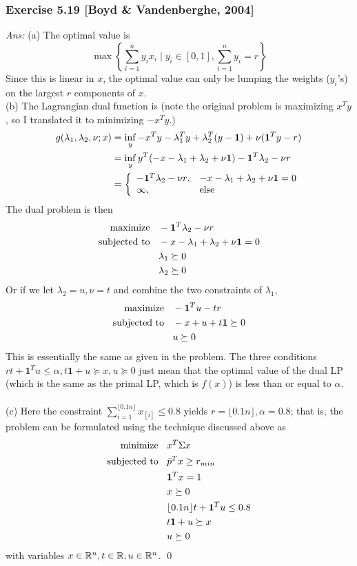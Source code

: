 \documentclass[12pt,a4paper]{article}
\renewcommand{\l}{\left}\renewcommand{\r}{\right}
\newcommand{\casebrak}[4]{\left \{ \begin{array}{ll} {#1},&{#2}\\{#3},&{#4} \end{array} \right.}
\newcommand{\SUM}[2]{\sum\limits_{#1}^{#2}}
\def\R{\ifmmode\mathbb R\fi}
\begin{document}
\newpage\subsubsection*{Exercise 5.19 [Boyd \& Vandenberghe, 2004]}
{\it Ans:} (a) The optimal value is 
$$\max \l\{ \SUM{i=1}n y_ix_i \mid y_i \in [0,1], \SUM{i=1}n y_i = r\r\}$$
Since this is linear in $x$, the optimal value can only be lumping the weights ($y_i$'s) on the largest $r$ components of $x$.  \\
(b) The Lagrangian dual function is (note the original problem is maximizing $x^T y$, so I translated it to minimizing $-x^T y$.)
\begin{align*}
g(\lambda_1, \lambda_2, \nu; x) &= \inf_y -x^Ty -\lambda_1^Ty + \lambda_2^T(y - \mathbf 1) + \nu (\mathbf 1^Ty - r) \\
&= \inf_y  y^T(-x -\lambda_1 + \lambda_2 + \nu \mathbf 1) - \mathbf1^T \lambda_2 - \nu r \\
&= \casebrak{ -\mathbf1^T\lambda_2 - \nu r}{-x-\lambda_1+\lambda_2 + \nu\mathbf1 = 0}{\-\infty}{\mbox{else}}
\end{align*}
The dual problem is then
\begin{align*}
\mbox{maximize \;\;} & -\mathbf1^T\lambda_2 - \nu r\\
\mbox{subjected to \;\;} & -x-\lambda_1+\lambda_2 + \nu\mathbf1 = 0 \\
&  \lambda_1 \succeq 0\\
& \lambda_2 \succeq 0
\end{align*}
Or if we let $\lambda_2 = u, \nu = t$ and combine the two constraints of $\lambda_1$, 
\begin{align*}
\mbox{maximize \;\;} & -\mathbf1^Tu - tr\\
\mbox{subjected to \;\;} & -x+u + t\mathbf1 \succeq 0 \\
& u \succeq 0
\end{align*}
This is essentially the same as given in the problem. The three conditions $rt + \mathbf1^Tu\leq \alpha, t\mathbf1 + u \succeq x, u\succeq 0$ just mean that the optimal value of the dual LP (which is the same as the primal LP, which is $f(x)$) is less than or equal to $\alpha$. \\
\\
(c) Here the constraint $\SUM{i=1}{\lfloor0.1n\rfloor} x_{[i]} \leq 0.8$ yields $r = \lfloor0.1n\rfloor, \alpha = 0.8$; that is, the problem can be formulated using the technique discussed above as 
\begin{align*}
\mbox{minimize \;\;} & x^T\Sigma x\\
\mbox{subjected to \;\;} & \bar p^T x \geq r_{min} \\
& \mathbf1^T x = 1\\
& x\succeq 0\\
&  \lfloor0.1n\rfloor t + \mathbf1^Tu \leq 0.8\\
& t\mathbf1 + u \succeq x\\
& u \succeq 0 \\
\end{align*}
with variables $x \in \R^n, t\in\R, u\in\R^n$. \qed
\end{document}
